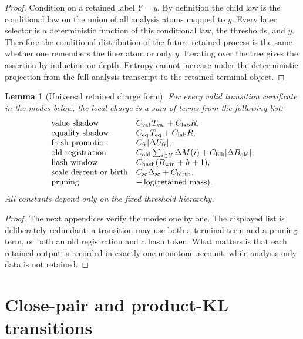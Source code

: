 \documentclass[11pt]{article}
\newtheorem{lemma}[theorem]{Lemma}
\theoremstyle{remark}
\newcommand{\old}{\mathrm{old}}
\newcommand{\fr}{\mathrm{fr}}
\newcommand{\scal}{\mathrm{sc}}
\begin{document}
\begin{proof}
Condition on a retained label $Y=y$.  By definition the child law is the conditional law on the union of all analysis atoms mapped to $y$.  Every later selector is a deterministic function of this conditional law, the thresholds, and $y$.  Therefore the conditional distribution of the future retained process is the same whether one remembers the finer atom or only $y$.  Iterating over the tree gives the assertion by induction on depth.  Entropy cannot increase under the deterministic projection from the full analysis transcript to the retained terminal object.
\end{proof}

\begin{lemma}[Universal retained charge form]\label{lem:universal-charge}
For every valid transition certificate in the modes below, the local charge is a sum of terms from the following list:
\[
\begin{array}{ll}
\hbox{value shadow} & C_{\rm val}\,T_{\rm val}+C_{\rm lab}R,\\
\hbox{equality shadow} & C_{\rm eq}\,T_{\rm eq}+C_{\rm lab}R,\\
\hbox{fresh promotion} & C_{\fr}|\Delta U_{\fr}|,\\
\hbox{old registration} & C_{\old}\sum_{i\in U}\Delta M(i)+C_{\rm blk}|\Delta B_{\old}|,\\
\hbox{hash window} & C_{\rm hash}(B_{\rm win}+h+1),\\
\hbox{scale descent or birth} & C_{\scal}\Delta_{\scal}+C_{\rm birth},\\
\hbox{pruning} & -\log(\hbox{retained mass}).
\end{array}
\]
All constants depend only on the fixed threshold hierarchy.
\end{lemma}

\begin{proof}
The next appendices verify the modes one by one.  The displayed list is deliberately redundant: a transition may use both a terminal term and a pruning term, or both an old registration and a hash token.  What matters is that each retained output is recorded in exactly one monotone account, while analysis-only data is not retained.
\end{proof}

\section{Close-pair and product-KL transitions}\label{app:close-product}
\end{document}
